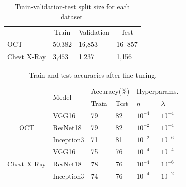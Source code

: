 \begin{table}[ht]
\caption{Train-validation-test split size for each dataset.}
\label{tbl:dataset_sizes}
\begin{tabular}{|l|l|l|l|}
\hline
\multirow{2}{*}{} & \multicolumn{1}{c|}{\multirow{2}{*}{Train}} & \multicolumn{1}{c|}{\multirow{2}{*}{Validation}} & \multicolumn{1}{c|}{\multirow{2}{*}{Test}} \\
 & \multicolumn{1}{c|}{} & \multicolumn{1}{c|}{} & \multicolumn{1}{c|}{} \\ \hline
OCT & 50,382 & 16,853 & 16, 857 \\ \hline
Chest X-Ray & 3,463 & 1,237 & 1,156 \\ \hline
\end{tabular}
\end{table}

\begin{table}[ht]
\caption{Train and test accuracies after fine-tuning.}
\label{tbl:finetune_accuracies}
\begin{tabular}{|c|l|l|l|l|l|l|}
\hline
\multicolumn{1}{|l|}{\multirow{3}{*}{}} & \multirow{3}{*}{Model} & \multicolumn{2}{l|}{\multirow{2}{*}{Accuracy(\%)}} & \multicolumn{3}{l|}{\multirow{2}{*}{Hyperparams.}} \\
\multicolumn{1}{|l|}{} &  & \multicolumn{2}{l|}{} & \multicolumn{3}{l|}{} \\ \cline{3-7} 
\multicolumn{1}{|l|}{} &  & Train & Test & \multicolumn{2}{l|}{$\eta$} & $\lambda$ \\ \hline
\multirow{3}{*}{OCT} & VGG16 & 79 & 82 & \multicolumn{2}{l|}{$10^{-4}$} & $10^{-4}$ \\ \cline{2-7} 
 & ResNet18 & 79 & 82 & \multicolumn{2}{l|}{$10^{-2}$} & $10^{-4}$ \\ \cline{2-7} 
 & Inception3 & 71 & 81 & \multicolumn{2}{l|}{$10^{-2}$} & $10^{-6}$ \\ \hline
\multirow{3}{*}{Chest X-Ray} & VGG16 & 75 & 76 & \multicolumn{2}{l|}{$10^{-4}$} & $10^{-4}$ \\ \cline{2-7} 
 & ResNet18 & 78 & 76 & \multicolumn{2}{l|}{$10^{-4}$} & $10^{-6}$ \\ \cline{2-7} 
 & Inception3 & 74 & 76 & \multicolumn{2}{l|}{$10^{-4}$} & $10^{-2}$ \\ \hline
\end{tabular}
\end{table}


